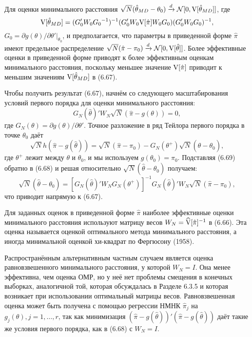 Для оценки минимального расстояния $\sqrt{N} (\hat{\theta}_{MD}-\theta_0) \xrightarrow{d} \mathcal{N}[0, \mathrm{V}[\hat{\theta}_{MD}]]$, где
\begin{equation}
\mathrm{V}[\hat{\theta}_{MD}]=(G'_0 W_0 {G_0}^{-1})^{-1} (G'_0 W_0 \mathrm{V}[\hat{\pi}] W_0 G_0) (G'_0 W_0 G_0)^{-1},
\end{equation}
$G_0=\partial g(\theta) / \partial \theta'|_{\theta_0}$, и предполагается, что параметры в приведенной форме $\hat{\pi}$ имеют предельное распределение $\sqrt{N} (\hat{\pi}-\pi_0) \xrightarrow{d} \mathcal{N}[0,\mathrm{V}[\hat{\theta}]]$. Более эффективные оценки в приведенной форме приводят к более эффективным оценкам минимального расстояния, поскольку меньшее значение $\mathrm{V}[\hat{\pi}]$ приводит к меньшим значениям $\mathrm{V}[\hat{\theta}_{MD}]$ в (6.67).

Чтобы получить результат (6.67), начнём со следующего масштабирования условий первого порядка для оценки минимального расстояния:
\begin{equation}
G_N(\hat{\theta})' W_N \sqrt{N} (\hat{\pi}-g(\theta))=0,
\end{equation}
где $G_N(\theta)=\partial g(\theta) / \partial \theta'$. Точное разложение в ряд Тейлора первого порядка в точке $\theta_0$ даёт
\begin{equation}
\sqrt{N} h(\hat{\pi}-g(\hat{\theta}))= \sqrt{N} (\hat{\pi}-\pi_0) - G_N (\theta^+) \sqrt{N} (\hat{\theta}-\theta_0),
\end{equation}
где $\theta^+$ лежит между $\theta$ и $\theta_0$, и мы используем $g(\theta_0)=\pi_0$. Подставляя (6.69) обратно в (6.68) и решая относительно $\sqrt{N} (\hat{\theta}-\theta_0)$ получаем:
\begin{equation}
\sqrt{N} (\hat{\theta}-\theta_0)= [G_N(\hat{\theta})' W_N G_N(\theta^+)]^{-1} G_N(\hat{\theta})' W_N \sqrt{N} (\hat{\pi}-\pi_0),
\end{equation}
что приводит напрямую к (6.67).

Для заданных оценок в приведенной форме $\hat{\pi}$ наиболее эффективные оценки минимального расстояния используют матрицу весов $W_N=\widehat{\mathrm{V}}[\hat{\pi}]^{-1}$ в (6.66). Эта оценка называется оценкой оптимального метода минимального расстояния, а иногда минимальной оценкой хи-квадрат по Фергюсону (1958).

Распространённым альтернативным частным случаем является оценка равновзвешенного минимального расстояния, у которой $W_N=I$. Она менее эффективна, чем оценка ОМР, но у неё нет проблемы смещения в конечных выборках, аналогичной той, которая обсуждалась в Разделе 6.3.5 и которая возникает при использовании оптимальный матрицы весов. Равновзвешенная оценка может быть получена с помощью регрессии НМНК $\hat{\pi}_j$ на $g_j(\theta), j=1, \dots, r$, так как минимизация $(\hat{\pi}-g(\hat{\theta}))'(\hat{\pi}-g(\hat{\theta}))$ даёт такие же условия первого порядка, как в (6.68) с $W_N=I$.

